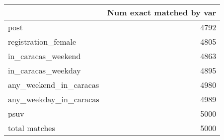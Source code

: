 \begin{tabular}{lr}
\toprule
{} &  Num exact matched by var \\
\midrule
post                   &                      4792 \\
registration\_female    &                      4805 \\
in\_caracas\_weekend     &                      4863 \\
in\_caracas\_weekday     &                      4895 \\
any\_weekend\_in\_caracas &                      4980 \\
any\_weekday\_in\_caracas &                      4989 \\
psuv                   &                      5000 \\
total matches          &                      5000 \\
\bottomrule
\end{tabular}

